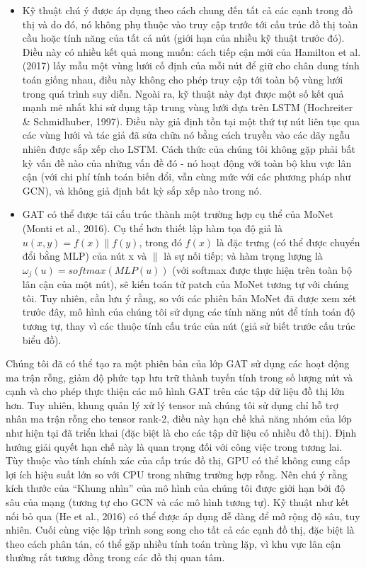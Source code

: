 \begin{itemize}
		\item Kỹ thuật chú ý được áp dụng theo cách chung đến tất cả các cạnh trong đồ thị và do đó, nó không phụ thuộc vào truy cập trước tới cấu trúc đồ thị toàn cầu hoặc tính năng của tất cả nút (giới hạn của nhiều kỹ thuật trước đó). Điều này có nhiều kết quả mong muốn: cách tiếp cận mới của Hamilton et al. (2017) lấy mẫu một vùng lưới cố định của mỗi nút để giữ cho chân dung tính toán giống nhau, điều này không cho phép truy cập tới toàn bộ vùng lưới trong quá trình suy diễn. Ngoài ra, kỹ thuật này đạt được một số kết quả mạnh mẽ nhất khi sử dụng tập trung vùng lưới dựa trên LSTM (Hochreiter \& Schmidhuber, 1997). Điều này giả định tồn tại một thứ tự nút liên tục qua các vùng lưới và tác giả đã sửa chữa nó bằng cách truyền vào các dãy ngẫu nhiên được sắp xếp cho LSTM. Cách thức của chúng tôi không gặp phải bất kỳ vấn đề nào của những vấn đề đó - nó hoạt động với toàn bộ khu vực lân cận (với chi phí tính toán biến đổi, vẫn cùng mức với các phương pháp như GCN), và không giả định bất kỳ sắp xếp nào trong nó.
		
		\item GAT có thể được tái cấu trúc thành một trường hợp cụ thể của MoNet (Monti et al., 2016). Cụ thể hơn thiết lập hàm tọa độ giả là $u(x,y) = f(x)\|f(y)$, trong đó $f(x)$ là đặc trưng (có thể được chuyển đổi bằng MLP) của nút x và $\|$ là sự nối tiếp; và hàm trọng lượng là 
		\(\omega_j(u) = softmax(MLP(u))\) 
		(với softmax được thực hiện trên toàn bộ lân cận của một nút), sẽ kiến toán tử patch của MoNet tương tự với chúng tôi. Tuy nhiên, cần lưu ý rằng, so với các phiên bản MoNet đã được xem xét trước đây, mô hình của chúng tôi sử dụng các tính năng nút để tính toán độ tương tự, thay vì các thuộc tính cấu trúc của nút (giả sử biết trước cấu trúc biểu đồ).
		
	\end{itemize}

Chúng tôi đã có thể tạo ra một phiên bản của lớp GAT sử dụng các hoạt dộng ma trận rỗng, giảm độ phức tạp lưu trữ thành tuyến tính trong số lượng nút và cạnh và cho phép thực thiện các mô hình GAT trên các tập dữ liệu đồ thị lớn hơn. Tuy nhiên, khung quản lý xử lý tensor mà chúng tôi sử dụng chỉ hỗ trợ nhân ma trận rỗng cho tensor rank-2, điều này hạn chế khả năng nhóm của lớp như hiện tại đã triển khai (đặc biệt là cho các tập dữ liệu có nhiều đồ thị). Định hướng giải quyết hạn chế này là quan trọng đối với công việc trong tương lai. Tùy thuộc vào tính chính xác của cấp trúc đồ thị, GPU có thể không cung cấp lợi ích hiệu suất lớn so với CPU trong những trường hợp rỗng. Nên chú ý rằng kích thước của “Khung nhìn” của mô hình của chúng tôi được giới hạn bởi độ sâu của mạng (tương tự cho GCN và các mô hình tương tự). Kỹ thuật như kết nối bỏ qua (He et al., 2016) có thể được áp dụng dễ dàng để mở rộng độ sâu, tuy nhiên. Cuối cùng việc lập trình song song cho tất cả các cạnh đồ thị, đặc biệt là theo cách phân tán, có thể gặp nhiều tính toán trùng lặp, vì khu vực lân cận thường rất tương đồng trong các đồ thị quan tâm.












